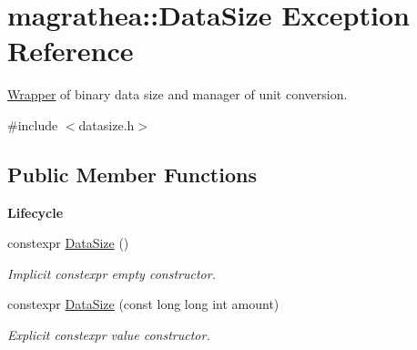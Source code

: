\hypertarget{exceptionmagrathea_1_1DataSize}{\section{magrathea\-:\-:Data\-Size Exception Reference}
\label{exceptionmagrathea_1_1DataSize}
}


\hyperlink{exceptionmagrathea_1_1Wrapper}{Wrapper} of binary data size and manager of unit conversion.  




{\ttfamily \#include $<$datasize.\-h$>$}

\subsection*{Public Member Functions}
\begin{Indent}{\bf Lifecycle}\par
\begin{DoxyCompactItemize}
\item 
constexpr \hyperlink{exceptionmagrathea_1_1DataSize_a1df5bce30b0ba2a4eeb5cb435482f1b6}{Data\-Size} ()
\begin{DoxyCompactList}\small\item\em Implicit constexpr empty constructor. \end{DoxyCompactList}\item 
constexpr \hyperlink{exceptionmagrathea_1_1DataSize_a1ea878322e7b9d9d35d21d46ee7ae398}{Data\-Size} (const long long int amount)
\begin{DoxyCompactList}\small\item\em Explicit constexpr value constructor. \end{DoxyCompactList}\end{DoxyCompactItemize}
\end{Indent}
